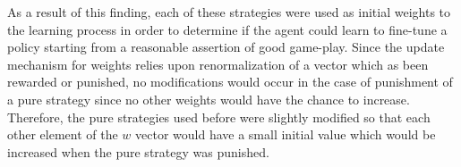 As a result of this finding,
each of these strategies were used as initial weights to the learning process
in order to determine if the agent could learn to fine-tune a policy starting
from a reasonable assertion of good game-play.
%
Since the update mechanism for weights relies upon renormalization of a vector
which as been rewarded or punished,
no modifications would occur in the case of punishment of a pure strategy
since no other weights would have the chance to increase.
%
Therefore,
the pure strategies used before were slightly modified so that each other
element of the $w$ vector would have a small initial value which would be
increased when the pure strategy was punished.




